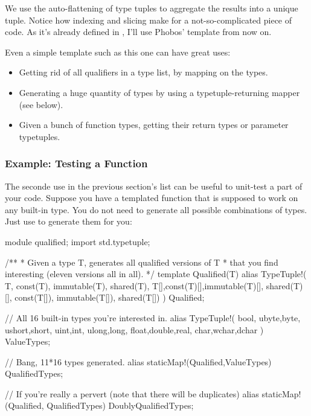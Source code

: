 
We use the auto-flattening of type tuples to aggregate the results into a unique tuple. Notice how indexing and slicing make for a not-so-complicated piece of code. As it's already defined in , I'll use Phobos' template from now on.

Even a simple template such as this one can have great uses:

\begin{itemize}
\item Getting rid of all qualifiers in a type list, by mapping  on the types.
\item Generating a huge quantity of types by using a typetuple-returning mapper (see below).
\item Given a bunch of function types, getting their return types or parameter typetuples.
\end{itemize}

\subsubsection{Example: Testing a Function}

The seconde use in the previous section's list can be useful to unit-test a part of your code. Suppose you have a templated function that is supposed to work on any built-in type. You do not need to generate all possible combinations of types. Just use  to generate them for you:

\begin{dcode}
module qualified;
import std.typetuple;

/** 
* Given a type T, generates all qualified versions of T
* that you find interesting (eleven versions all in all).
*/
template Qualified(T)
{
    alias TypeTuple!(
                     T, const(T), immutable(T), shared(T),
                     T[],const(T)[],immutable(T)[], shared(T)[], 
                     const(T[]), immutable(T[]), shared(T[])
                    ) Qualified;
}

// All 16 built-in types you're interested in.
alias TypeTuple!(
                 bool,
                 ubyte,byte,
                 ushort,short,
                 uint,int,
                 ulong,long,
                 float,double,real,
                 char,wchar,dchar
                ) ValueTypes;

// Bang, 11*16 types generated.
alias staticMap!(Qualified,ValueTypes) QualifiedTypes;

// If you're really a pervert (note that there will be duplicates)
alias staticMap!(Qualified, QualifiedTypes) DoublyQualifiedTypes;
\end{dcode}

